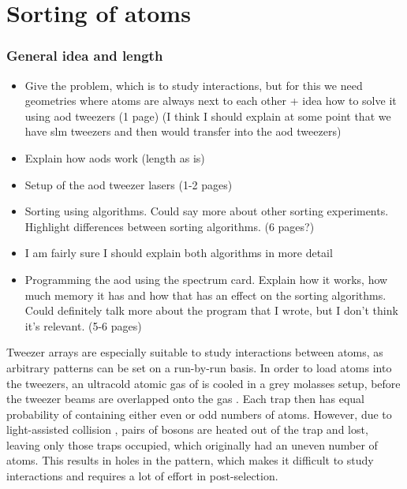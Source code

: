\chapter{Sorting of atoms}

\subsection*{General idea and length}

\begin{itemize}
	\item Give the problem, which is to study interactions, but for this we need geometries where atoms are always next to each other + idea how to solve it using aod tweezers (1 page) (I think I should explain at some point that we have slm tweezers and then would transfer into the aod tweezers)
	\item Explain how aods work (length as is)
	\item Setup of the aod tweezer lasers (1-2 pages)
	\item Sorting using algorithms. Could say more about other sorting experiments. Highlight differences between sorting algorithms. (6 pages?)
	\item I am fairly sure I should explain both algorithms in more detail
	\item Programming the aod using the spectrum card. Explain how it works, how much memory it has and how that has an effect on the sorting algorithms. Could definitely talk more about the program that I wrote, but I don't think it's relevant. (5-6 pages)
\end{itemize}


Tweezer arrays are especially suitable to study interactions between atoms, as arbitrary patterns can be set on a run-by-run basis. In order to load atoms into the tweezers, an ultracold atomic gas of  is cooled in a grey molasses setup, before the tweezer beams are overlapped onto the gas \cite{Duda2017}. Each trap then has equal probability of containing either even or odd numbers of atoms. However, due to light-assisted collision \cite{Cooper2018}, pairs of bosons are heated out of the trap and lost, leaving only those traps occupied, which originally had an uneven number of atoms. This results in holes in the pattern, which makes it difficult to study interactions and requires a lot of effort in post-selection.

